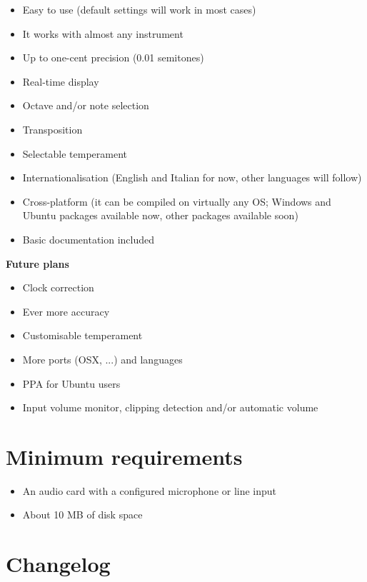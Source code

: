 \begin{itemize}
	\item Easy to use (default settings will work in most cases)
	\item It works with almost any instrument
	\item Up to one-cent precision (0.01 semitones)
	\item Real-time display
	\item Octave and/or note selection
	\item Transposition
	\item Selectable temperament
	\item Internationalisation (English and Italian for now, other languages will follow)
	\item Cross-platform (it can be compiled on virtually any OS;
		Windows and Ubuntu packages available now,  other packages available soon)
	\item Basic documentation included
\end{itemize}

\textbf{Future plans}
\begin{itemize}
	\item Clock correction
	\item Ever more accuracy
	\item Customisable temperament
	\item More ports (OSX, ...) and languages
	\item PPA for Ubuntu users
	\item Input volume monitor, clipping detection and/or automatic volume
\end{itemize}

\section{Minimum requirements}\label{requirements}

\begin{itemize}
\item An audio card with a configured microphone or line input
\item About 10 MB of disk space
\end{itemize}

\section{Changelog}\label{changelog}

